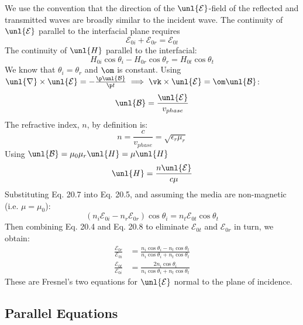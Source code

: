 \documentclass[a4paper, 11pt, normalem]{report}
\renewcommand\E{\mathcal{E}}
\newcommand\uE{\unl{\E}}
\renewcommand\B{\mathcal{B}}
\newcommand\uB{\unl{\B}}
\renewcommand\del{\unl{\nabla}}
\newcommand\er{\epsilon_r}
\begin{document}
We use the convention that the direction of the $\uE$-field of the reflected and transmitted waves are broadly similar to the incident wave.
The continuity of $\uE$ parallel to the interfacial plane requires
\begin{equation}
	\E_{0i} + \E_{0r} = \E_{0t}
\end{equation}
The continuity of $\unl{H}$ parallel to the interfacial:
\begin{equation}
	H_{0i}\cos\theta_i - H_{0r}\cos\theta_r = H_{0t}\cos\theta_t
\end{equation}
We know that $\theta_i = \theta_r$ and $\om$ is constant.
Using $\del\times\uE = -\frac{\p\uB}{\p t} \implies \vk\times\uE = \om\uB$:
\begin{equation}
	\uB = \frac{\uE}{v_{phase}}
\end{equation}
The refractive index, $n$, by definition is:
\begin{equation}
	n = \frac{c}{v_{phase}} = \sqrt{\er\mu_r}
\end{equation}
Using $\uB = \mu_0\mu_r\unl{H} = \mu\unl{H}$
\begin{equation}
	\unl{H} = \frac{n\uE}{c\mu}
\end{equation}
Substituting Eq. 20.7 into Eq. 20.5, and assuming the media are non-magnetic (i.e. $\mu = \mu_0$):
\begin{equation}
	(n_i\E_{0i} - n_r\E_{0r})\cos\theta_i = n_t\E_{0t}\cos\theta_t
\end{equation}
Then combining Eq. 20.4 and Eq. 20.8 to eliminate $\E_{0t}$ and $\E_{0r}$ in turn, we obtain:
\begin{align}
	\frac{\E_{0r}}{\E_{0i}} &= \frac{n_i\cos\theta_i - n_t\cos\theta_t}{n_i\cos\theta_i + n_t\cos\theta_t} \\
	\frac{\E_{0t}}{\E_{0i}} &= \frac{2n_i\cos\theta_i}{n_i\cos\theta_i + n_t\cos\theta_t}
\end{align}
These are Fresnel's two equations for $\uE$ normal to the plane of incidence.

\subsection{Parallel Equations}
\end{document}
